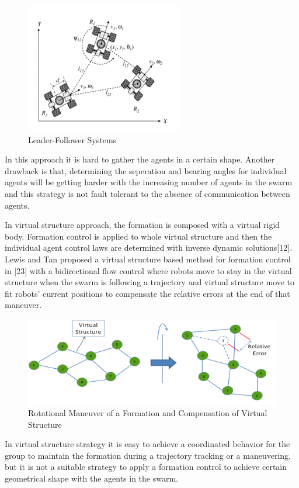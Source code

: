 \begin{figure}[H]
	\caption{Leader-Follower Systems}
	\centering
	\includegraphics[scale = 1]{leader}
\end{figure}


In this approach it is hard to gather the agents in a certain shape. Another drawback is that, determining the seperation and bearing angles for individual agents will be getting harder with the increasing number of agents in the swarm and this strategy is not fault tolerant to the absence of communication between agents.


In virtual structure approach, the formation is composed with a virtual rigid body. Formation control is applied to whole virtual structure and then the individual agent control laws are determined with inverse dynamic solutions[12].  Lewis and Tan proposed a virtual structure based method for formation control in [23] with a bidirectional flow control where robots move to stay in the virtual structure when the swarm is following a trajectory and virtual structure move to fit robots' current positions to compensate the relative errors at the end of that maneuver. 

\begin{figure}[H]
	\caption{Rotational Maneuver of a Formation and Compensation of Virtual Structure}
	\centering
	\includegraphics[scale = 1]{virtual_structure}
\end{figure}

In virtual structure strategy it is easy to achieve a coordinated behavior for the group to maintain the formation during a trajectory tracking or a maneuvering, but it is not a suitable strategy to apply a formation control to achieve certain geometrical shape with the agents in the swarm. 


